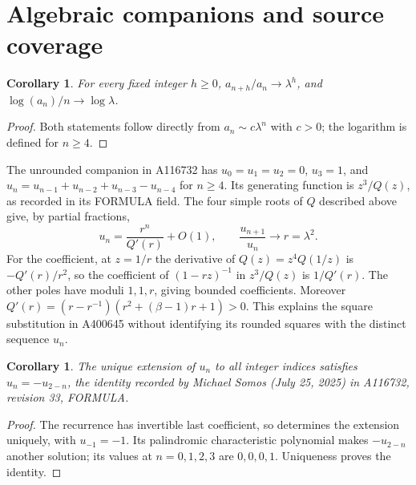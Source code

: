 \documentclass[11pt]{article}
\newtheorem{corollary}[theorem]{Corollary}
\begin{document}
\section{Algebraic companions and source coverage}
\begin{corollary}
For every fixed integer $h\ge0$, $a_{n+h}/a_n\to\lambda^h$, and
$\log(a_n)/n\to\log\lambda$.
\end{corollary}
\begin{proof}
Both statements follow directly from $a_n\sim c\lambda^n$ with $c>0$;
the logarithm is defined for $n\ge4$.
\end{proof}

The unrounded companion in A116732 \cite{linear} has
$u_0=u_1=u_2=0$, $u_3=1$, and
$u_n=u_{n-1}+u_{n-2}+u_{n-3}-u_{n-4}$ for $n\ge4$.
Its generating function is $z^3/Q(z)$, as recorded in its FORMULA field.
The four simple roots of $Q$ described above give, by partial fractions,
\[
 u_n=\frac{r^n}{Q'(r)}+O(1),\qquad
 \frac{u_{n+1}}{u_n}\longrightarrow r=\lambda^2.
\]
For the coefficient, at $z=1/r$ the derivative of $Q(z)=z^4Q(1/z)$
is $-Q'(r)/r^2$, so the coefficient of $(1-rz)^{-1}$ in $z^3/Q(z)$
is $1/Q'(r)$. The other poles have moduli $1,1,r$, giving bounded
coefficients. Moreover
$Q'(r)=(r-r^{-1})(r^2+(\beta-1)r+1)>0$.
This explains the square substitution in A400645 without identifying
its rounded squares with the distinct sequence $u_n$.

\begin{corollary}\label{cor:reverse}
The unique extension of $u_n$ to all integer indices satisfies
$u_n=-u_{2-n}$, the identity recorded by Michael Somos (July 25, 2025)
in A116732, revision 33, FORMULA.
\end{corollary}
\begin{proof}
The recurrence has invertible last coefficient, so determines the
extension uniquely, with $u_{-1}=-1$. Its palindromic characteristic
polynomial makes $-u_{2-n}$ another solution; its values at $n=0,1,2,3$
are $0,0,0,1$. Uniqueness proves the identity.
\end{proof}
\end{document}
